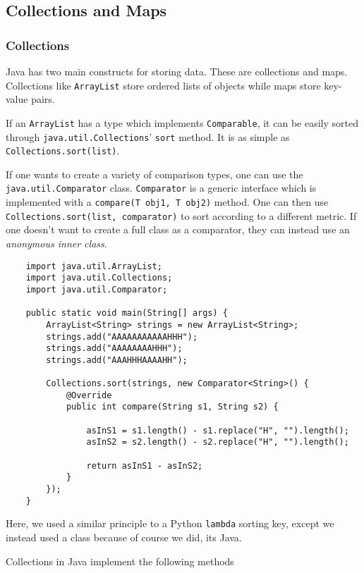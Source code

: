 \documentclass[12pt]{report}
\newcommand{\code}[1]{\lstinline{#1}}
\begin{document}
\begin{flushleft}
\subsection*{Collections and Maps}

\subsubsection*{Collections}

Java has two main constructs for storing data. These are collections and maps.
Collections like \code{ArrayList} store ordered lists of objects while maps
store key-value pairs. \par
If an \code{ArrayList} has a type which implements \code{Comparable}, it can
be easily sorted through \code{java.util.Collections}' \code{sort} method.
It is as simple as \code{Collections.sort(list)}. \par
If one wants to create a variety of comparison types, one can use the
\code{java.util.Comparator} class. \code{Comparator} is a generic interface
which is implemented with a \code{compare(T obj1, T obj2)} method. One can then
use \code{Collections.sort(list, comparator)} to sort according to a different
metric. If one doesn't want to create a full class as a comparator, they can
instead use an \textit{anonymous inner class}.

\begin{lstlisting}
    import java.util.ArrayList;
    import java.util.Collections;
    import java.util.Comparator;
    
    public static void main(String[] args) {
        ArrayList<String> strings = new ArrayList<String>;
        strings.add("AAAAAAAAAAAHHH");
        strings.add("AAAAAAAAHHH");
        strings.add("AAAHHHAAAAHH");

        Collections.sort(strings, new Comparator<String>() {
            @Override
            public int compare(String s1, String s2) {

                asInS1 = s1.length() - s1.replace("H", "").length();
                asInS2 = s2.length() - s2.replace("H", "").length();

                return asInS1 - asInS2;
            }
        });
    }
\end{lstlisting}

Here, we used a similar principle to a Python \code{lambda} sorting key, except
we instead used a class because of course we did, its Java.

\bigskip
Collections in Java implement the following methods


\end{flushleft}
\end{document}
